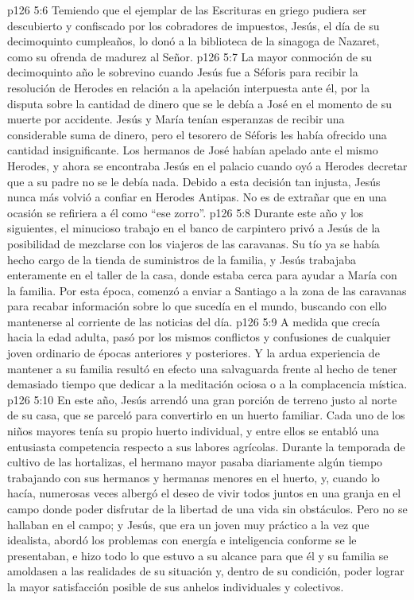 \vs p126 5:6 Temiendo que el ejemplar de las Escrituras en griego pudiera ser descubierto y confiscado por los cobradores de impuestos, Jesús, el día de su decimoquinto cumpleaños, lo donó a la biblioteca de la sinagoga de Nazaret, como su ofrenda de madurez al Señor.
\vs p126 5:7 \pc La mayor conmoción de su decimoquinto año le sobrevino cuando Jesús fue a Séforis para recibir la resolución de Herodes en relación a la apelación interpuesta ante él, por la disputa sobre la cantidad de dinero que se le debía a José en el momento de su muerte por accidente. Jesús y María tenían esperanzas de recibir una considerable suma de dinero, pero el tesorero de Séforis les había ofrecido una cantidad insignificante. Los hermanos de José habían apelado ante el mismo Herodes, y ahora se encontraba Jesús en el palacio cuando oyó a Herodes decretar que a su padre no se le debía nada. Debido a esta decisión tan injusta, Jesús nunca más volvió a confiar en Herodes Antipas. No es de extrañar que en una ocasión se refiriera a él como “ese zorro”.
\vs p126 5:8 Durante este año y los siguientes, el minucioso trabajo en el banco de carpintero privó a Jesús de la posibilidad de mezclarse con los viajeros de las caravanas. Su tío ya se había hecho cargo de la tienda de suministros de la familia, y Jesús trabajaba enteramente en el taller de la casa, donde estaba cerca para ayudar a María con la familia. Por esta época, comenzó a enviar a Santiago a la zona de las caravanas para recabar información sobre lo que sucedía en el mundo, buscando con ello mantenerse al corriente de las noticias del día.
\vs p126 5:9 A medida que crecía hacia la edad adulta, pasó por los mismos conflictos y confusiones de cualquier joven ordinario de épocas anteriores y posteriores. Y la ardua experiencia de mantener a su familia resultó en efecto una salvaguarda frente al hecho de tener demasiado tiempo que dedicar a la meditación ociosa o a la complacencia mística.
\vs p126 5:10 \pc En este año, Jesús arrendó una gran porción de terreno justo al norte de su casa, que se parceló para convertirlo en un huerto familiar. Cada uno de los niños mayores tenía su propio huerto individual, y entre ellos se entabló una entusiasta competencia respecto a sus labores agrícolas. Durante la temporada de cultivo de las hortalizas, el hermano mayor pasaba diariamente algún tiempo trabajando con sus hermanos y hermanas menores en el huerto, y, cuando lo hacía, numerosas veces albergó el deseo de vivir todos juntos en una granja en el campo donde poder disfrutar de la libertad de una vida sin obstáculos. Pero no se hallaban en el campo; y Jesús, que era un joven muy práctico a la vez que idealista, abordó los problemas con energía e inteligencia conforme se le presentaban, e hizo todo lo que estuvo a su alcance para que él y su familia se amoldasen a las realidades de su situación y, dentro de su condición, poder lograr la mayor satisfacción posible de sus anhelos individuales y colectivos.
